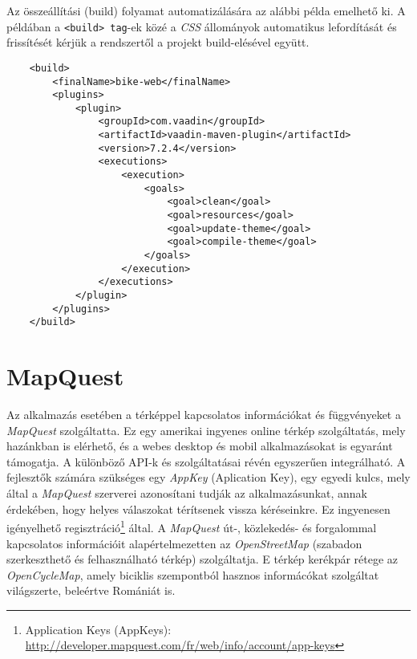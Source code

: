 \par Az összeállítási (build) folyamat automatizálására az alábbi példa emelhető ki. A példában a {\tt <build> tag}-ek közé a \textit{CSS} állományok automatikus lefordítását és frissítését kérjük a rendszertől a projekt build-elésével együtt.
\lstset{language=XML}
\begin{lstlisting}
	<build>
		<finalName>bike-web</finalName>
		<plugins>
			<plugin>
                <groupId>com.vaadin</groupId>
                <artifactId>vaadin-maven-plugin</artifactId>
                <version>7.2.4</version>
                <executions>
                    <execution>
                        <goals>
                            <goal>clean</goal>
                            <goal>resources</goal>
                            <goal>update-theme</goal>
                            <goal>compile-theme</goal>
                        </goals>
                    </execution>
                </executions>
            </plugin>
		</plugins>
	</build>
\end{lstlisting}


%
\section{MapQuest}\label{sec:FELH:mq}

Az alkalmazás esetében a térképpel kapcsolatos információkat és függvényeket a \textit{MapQuest} szolgáltatta. Ez egy amerikai ingyenes online térkép szolgáltatás, mely hazánkban is elérhető, és a webes desktop és mobil alkalmazásokat is egyaránt támogatja. A különböző API-k és szolgáltatásai révén egyszerűen integrálható. A fejlesztők számára szükséges egy \textit{AppKey} (Aplication Key), egy egyedi kulcs, mely által a \textit{MapQuest} szerverei azonosítani tudják az alkalmazásunkat, annak érdekében, hogy helyes válaszokat térítsenek vissza kéréseinkre. Ez ingyenesen igényelhető regisztráció\footnote{Application Keys (AppKeys): \\ \href{http://developer.mapquest.com/fr/web/info/account/app-keys}{http://developer.mapquest.com/fr/web/info/account/app-keys}}  által. A \textit{MapQuest}  \mbox{út-,} közlekedés- és forgalommal kapcsolatos információit alapértelmezetten az \textit{OpenStreetMap} (szabadon szerkeszthető és felhasználható térkép) szolgáltatja. E térkép kerékpár rétege az \textit{OpenCycleMap}, amely biciklis szempontból hasznos informácókat szolgáltat világszerte, beleértve Romániát is. 

